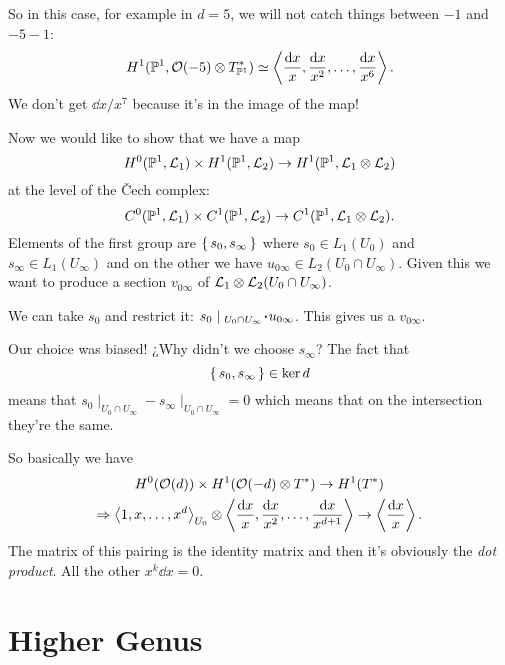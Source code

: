 \documentclass[12pt]{memoir}
\begin{document}
So in this case, for example in $d=5$, we will not catch things between $-1$ and $-5-1$:
$$H^1(\mathbb{P}^1,\mathcal{O}(-5)\otimes T^{\ast}_{\mathbb{P}^1})\simeq\left\langle \frac{\dd x}{x},\frac{\dd x}{x^2},\dots,\frac{\dd x}{x^6}\right\rangle.$$
We don't get $\dd x/x^7$ because it's in the image of the map!\par
Now we would like to show that we have a map 
$$H^0(\mathbb{P}^1,\mathcal{L}_1)\times H^1(\mathbb{P}^1,\mathcal{L}_2)\to H^1(\mathbb{P}^1,\mathcal{L}_1\otimes\mathcal{L}_2)$$
at the level of the \v{C}ech complex:
$$C^0(\mathbb{P}^1,\mathcal{L}_1)\times C^1(\mathbb{P}^1,\mathcal{L}_2)\to C^1(\mathbb{P}^1,\mathcal{L}_1\otimes\mathcal{L}_2).$$
Elements of the first group are $\{\,s_0,s_\infty\,\}$ where $s_0\in L_1(U_0)$ and $s_\infty\in L_1(U_\infty)$ and on the other we have $u_{0\infty}\in L_2(U_0\cap U_\infty)$. Given this we want to produce a section $v_{0\infty}$ of $\mathcal{L}_1\otimes\mathcal{L}_2(U_0\cap U_\infty)$.\par
We can take $s_0$ and restrict it: $s_0\mid_{U_0\cap U_\infty}\.u_{0\infty}$. This gives us a $v_{0\infty}$.\par
Our choice was biased! ¿Why didn't we choose $s_\infty$? The fact that $$\{\,s_0,s_\infty\,\}\in\ker d$$
means that $s_0\mid_{U_0\cap U_\infty}-s_\infty\mid_{U_0\cap U_\infty}=0$ which means that on the intersection they're the same.\par
So basically we have 
\begin{gather*}
H^0(\mathcal{O}(d))\times H^1(\mathcal{O}(-d)\otimes T^\ast)\to H^1(T^\ast)\\
\Rightarrow \left\langle 1,x,\dots,x^{d}\right\rangle_{U_0}\otimes\left\langle \frac{\dd x}{x},\frac{\dd x}{x^2},\dots,\frac{\dd x}{x^{d+1}}\right\rangle\to\left\langle \frac{\dd x}{x}\right\rangle.
\end{gather*}
The matrix of this pairing is the identity matrix and then it's obviously the \emph{dot product}. All the other $x^k\dd x=0$.

\chapter{Higher Genus}

\ifx\nextra\undefined
\printindex
\else\fi
\nocite{*}


\end{document}
